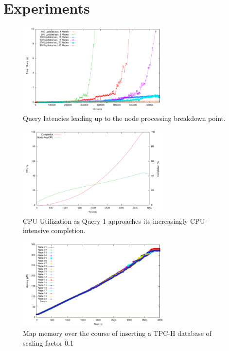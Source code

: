 
\section{Experiments}
\label{sec:experiments}

\begin{figure}
\begin{center}
\includegraphics[width=3.0in]{images/expandingbreakdown.pdf}
\caption{Query latencies leading up to the node processing breakdown point.}
\label{fig:expandingbreakdown}
\end{center}
\end{figure}
\begin{figure}
\begin{center}
\includegraphics[width=3.0in]{images/20nodes100mbUpdatesVsCPUCompletion.pdf}
\caption{CPU Utilization as Query 1 approaches its increasingly CPU-intensive completion.}
\label{fig:20nodes100mbUpdatesVsCPUCompletion}
\end{center}
\end{figure}
\begin{figure}
\begin{center}
\includegraphics[width=3.0in]{images/20nodes100mbUpdatesVsMemory.pdf}
\caption{Map memory over the course of inserting a TPC-H database of scaling factor 0.1}
\label{fig:20nodes100mbUpdatesVsMemory}
\end{center}
\end{figure}

